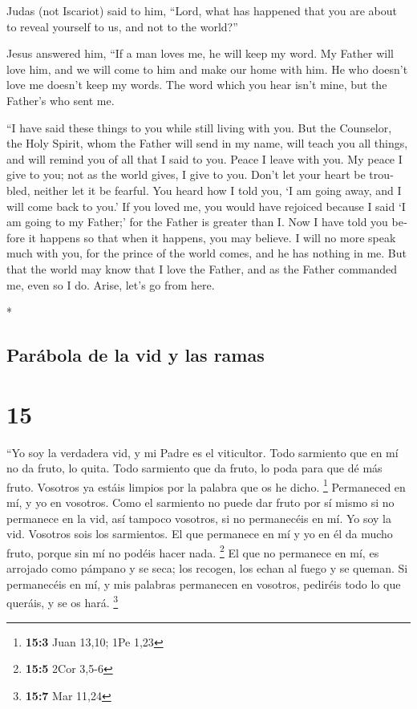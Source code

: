 \begin{paracol}{2}
\begin{otherlanguage}{english}
 Judas (not Iscariot) said to him, ``Lord, what has
happened that you are about to reveal yourself to us, and not to the
world?''

 Jesus answered him, ``If a man loves me, he will keep my
word. My Father will love him, and we will come to him and make our home
with him.  He who doesn't love me doesn't keep my words.
The word which you hear isn't mine, but the Father's who sent me.

 ``I have said these things to you while still living
with you.  But the Counselor, the Holy Spirit, whom the
Father will send in my name, will teach you all things, and will remind
you of all that I said to you.  Peace I leave with you.
My peace I give to you; not as the world gives, I give to you. Don't let
your heart be troubled, neither let it be fearful.  You
heard how I told you, `I am going away, and I will come back to you.' If
you loved me, you would have rejoiced because I said `I am going to my
Father;' for the Father is greater than I.  Now I have
told you before it happens so that when it happens, you may believe.
 I will no more speak much with you, for the prince of
the world comes, and he has nothing in me.  But that the
world may know that I love the Father, and as the Father commanded me,
even so I do. Arise, let's go from here.

\end{otherlanguage}

\switchcolumn[0]*

\hypertarget{paruxe1bola-de-la-vid-y-las-ramas}{%
\subsection{Parábola de la vid y las
ramas}\label{paruxe1bola-de-la-vid-y-las-ramas}}

\hypertarget{section-28}{%
\section{15}\label{section-28}}

 ``Yo soy la verdadera vid, y mi Padre es el viticultor.
 Todo sarmiento que en mí no da fruto, lo quita. Todo
sarmiento que da fruto, lo poda para que dé más fruto. 
Vosotros ya estáis limpios por la palabra que os he dicho. \footnote{\textbf{15:3}
  Juan 13,10; 1Pe 1,23}  Permaneced en mí, y yo en
vosotros. Como el sarmiento no puede dar fruto por sí mismo si no
permanece en la vid, así tampoco vosotros, si no permanecéis en mí.
 Yo soy la vid. Vosotros sois los sarmientos. El que
permanece en mí y yo en él da mucho fruto, porque sin mí no podéis hacer
nada. \footnote{\textbf{15:5} 2Cor 3,5-6}  El que no
permanece en mí, es arrojado como pámpano y se seca; los recogen, los
echan al fuego y se queman.  Si permanecéis en mí, y mis
palabras permanecen en vosotros, pediréis todo lo que queráis, y se os
hará. \footnote{\textbf{15:7} Mar 11,24}


\end{paracol}
